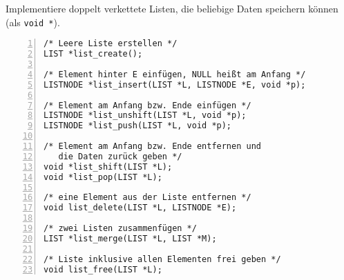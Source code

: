 \begin{aufg}
Implementiere doppelt verkettete Listen, die beliebige Daten speichern können (als \verb|void *|).

\begin{codelisting}
\begin{lstlisting}[numbers=left,numberstyle=\tiny,frame=tlrb]
/* Leere Liste erstellen */
LIST *list_create();

/* Element hinter E einfügen, NULL heißt am Anfang */
LISTNODE *list_insert(LIST *L, LISTNODE *E, void *p);

/* Element am Anfang bzw. Ende einfügen */
LISTNODE *list_unshift(LIST *L, void *p);
LISTNODE *list_push(LIST *L, void *p);

/* Element am Anfang bzw. Ende entfernen und 
   die Daten zurück geben */
void *list_shift(LIST *L);
void *list_pop(LIST *L);

/* eine Element aus der Liste entfernen */
void list_delete(LIST *L, LISTNODE *E);

/* zwei Listen zusammenfügen */
LIST *list_merge(LIST *L, LIST *M);

/* Liste inklusive allen Elementen frei geben */
void list_free(LIST *L);

\end{lstlisting}
\end{codelisting}

\end{aufg}